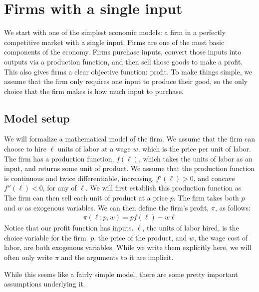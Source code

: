 \chapter{Firms with a single input}
We start with one of the simplest economic models: a firm in a perfectly competitive market with a single input. Firms are one of the most basic components of the economy. Firms purchase inputs, convert those inputs into outputs via a production function, and then sell those goods to make a profit. This also gives firms a clear objective function: profit. To make things simple, we assume that the firm only requires one input to produce their good, so the only choice that the firm makes is how much input to purchase. 

\section{Model setup}
We will formalize a mathematical model of the firm. We assume that the firm can choose to hire $\ell$ units of labor at a wage $w$, which is the price per unit of labor. The firm has a production function, $f(\ell)$, which takes the units of labor as an input, and returns some unit of product. We assume that the production function is continuous and twice differentiable, increasing, $f'(\ell) > 0$, and concave $f''(\ell) < 0$, for any of $\ell$. We will first establish this production function as The firm can then sell each unit of product at a price $p$. The firm takes both $p$ and $w$ as exogenous variables. We can then define the firm's profit, $\pi$, as follows:
\begin{align}
    \pi(\ell; p, w) = p f(\ell) - w \ell \label{profit_def}
\end{align}
Notice that our profit function has inputs. $\ell$, the units of labor hired, is the choice variable for the firm. $p$, the price of the product, and $w$, the wage cost of labor, are both exogenous variables. While we write them explicitly here, we will often only write $\pi$ and the arguments to it are implicit. 

While this seems like a fairly simple model, there are some pretty important assumptions underlying it.

